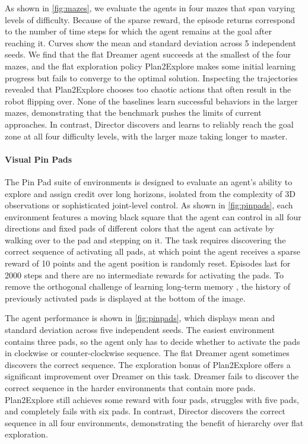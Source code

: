 As shown in \cref{fig:mazes}, we evaluate the agents in four mazes that span varying levels of difficulty. 
Because of the sparse reward, the episode returns correspond to the number of time steps for which the agent remains at the goal after reaching it. 
Curves show the mean and standard deviation across 5 independent seeds. 
We find that the flat Dreamer agent succeeds at the smallest of the four mazes, and the flat exploration policy Plan2Explore makes some initial learning progress but fails to converge to the optimal solution. 
Inspecting the trajectories revealed that Plan2Explore chooses too chaotic actions that often result in the robot flipping over. 
None of the baselines learn successful behaviors in the larger mazes, demonstrating that the benchmark pushes the limits of current approaches. 
In contrast, Director discovers and learns to reliably reach the goal zone at all four difficulty levels, with the larger maze taking longer to master.

\paragraph{Visual Pin Pads}

The Pin Pad suite of environments is designed to evaluate an agent's ability to explore and assign credit over long horizons, isolated from the complexity of 3D observations or sophisticated joint-level control. 
As shown in \cref{fig:pinpads}, each environment features a moving black square that the agent can control in all four directions and fixed pads of different colors that the agent can activate by walking over to the pad and stepping on it. 
The task requires discovering the correct sequence of activating all pads, at which point the agent receives a sparse reward of 10 points and the agent position is randomly reset. 
Episodes last for 2000 steps and there are no intermediate rewards for activating the pads. 
To remove the orthogonal challenge of learning long-term memory \citep{gregor2019simcore}, the history of previously activated pads is displayed at the bottom of the image.

The agent performance is shown in \cref{fig:pinpads}, which displays mean and standard deviation across five independent seeds. 
The easiest environment contains three pads, so the agent only has to decide whether to activate the pads in clockwise or counter-clockwise sequence. 
The flat Dreamer agent sometimes discovers the correct sequence. 
The exploration bonus of Plan2Explore offers a significant improvement over Dreamer on this task. 
Dreamer fails to discover the correct sequence in the harder environments that contain more pads. 
Plan2Explore still achieves some reward with four pads, struggles with five pads, and completely fails with six pads. 
In contrast, Director discovers the correct sequence in all four environments, demonstrating the benefit of hierarchy over flat exploration.

